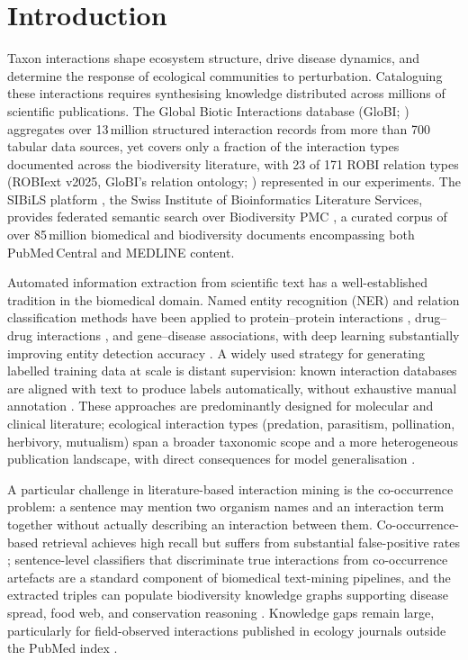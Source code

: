 \documentclass[11pt]{article}
\begin{document}
\section{Introduction}
\label{sec:intro}

Taxon interactions shape ecosystem structure, drive disease dynamics,
and determine the response of ecological communities to perturbation.
Cataloguing these interactions requires synthesising knowledge distributed
across millions of scientific publications.
The Global Biotic Interactions database (GloBI; \citealt{poelen2014global})
aggregates over 13\,million structured interaction records from more than 700 tabular
data sources, yet covers only a fraction of the interaction types documented
across the biodiversity literature, with 23 of 171 ROBI relation types
(ROBIext v2025, GloBI's relation ontology; \citealt{poelen2014global})
represented in our experiments.
The SIBiLS platform \citep{mottin2021sibils}, the Swiss Institute of
Bioinformatics Literature Services, provides federated semantic search over
Biodiversity PMC \citep{biodiversitypmc2024}, a curated corpus of over
85\,million biomedical and biodiversity documents encompassing both
PubMed\,Central and MEDLINE content.

Automated information extraction from scientific text has a well-established
tradition in the biomedical domain.
Named entity recognition (NER) and relation classification methods have been
applied to protein--protein interactions \citep{bunescu2005comparative},
drug--drug interactions \citep{lim2018drug}, and gene--disease associations,
with deep learning substantially improving entity detection accuracy
\citep{habibi2017deep}.
A widely used strategy for generating labelled training data at scale is
distant supervision: known interaction databases are aligned with text to
produce labels automatically, without exhaustive manual annotation
\citep{mintz2009distant}.
These approaches are predominantly designed for molecular and clinical
literature; ecological interaction types (predation, parasitism, pollination,
herbivory, mutualism) span a broader taxonomic scope and a more heterogeneous
publication landscape, with direct consequences for model generalisation
\citep{thessen2012nlp}.

A particular challenge in literature-based interaction mining is the
co-occurrence problem: a sentence may mention two organism names and an
interaction term together without actually describing an interaction between
them. Co-occurrence-based retrieval achieves high recall but suffers from
substantial false-positive rates \citep{bunescu2005comparative};
sentence-level classifiers that discriminate true interactions from
co-occurrence artefacts are a standard component of biomedical
text-mining pipelines, and the extracted triples can populate biodiversity
knowledge graphs supporting disease spread, food web, and conservation
reasoning \citep{page2016biodiversity, poisot2021global}. Knowledge gaps
remain large, particularly for field-observed interactions published in
ecology journals outside the PubMed index \citep{poisot2021global}.
\end{document}
